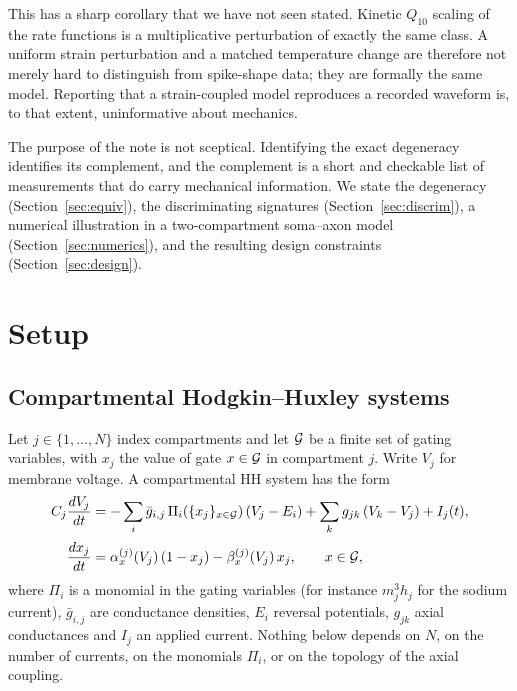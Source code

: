 This has a sharp corollary that we have not seen stated. Kinetic $Q_{10}$
scaling of the rate functions \citep{frankenhaeuser1963} is a multiplicative
perturbation of exactly the same class. A uniform strain perturbation and a
matched temperature change are therefore not merely hard to distinguish from
spike-shape data; they are formally the same model. Reporting that a
strain-coupled model reproduces a recorded waveform is, to that extent,
uninformative about mechanics.

The purpose of the note is not sceptical. Identifying the exact degeneracy
identifies its complement, and the complement is a short and checkable list of
measurements that do carry mechanical information. We state the degeneracy
(Section~\ref{sec:equiv}), the discriminating signatures
(Section~\ref{sec:discrim}), a numerical illustration in a two-compartment
soma--axon model (Section~\ref{sec:numerics}), and the resulting design
constraints (Section~\ref{sec:design}).

\section{Setup}
\label{sec:setup}

\subsection{Compartmental Hodgkin--Huxley systems}

Let $j\in\{1,\dots,N\}$ index compartments and let $\mathcal{G}$ be a finite set of
gating variables, with $x_j$ the value of gate $x\in\mathcal{G}$ in compartment
$j$. Write $V_j$ for membrane voltage. A compartmental HH system has the form
\begin{align}
C_j\frac{dV_j}{dt}
  &= -\sum_{i} \bar g_{i,j}\,\Pi_i\!\left(\{x_j\}_{x\in\mathcal{G}}\right)
     \left(V_j-E_i\right)
     +\sum_{k} g_{jk}\left(V_k-V_j\right) + I_j(t),
\label{eq:voltage}\\[2pt]
\frac{dx_j}{dt}
  &= \alpha_x^{(j)}(V_j)\left(1-x_j\right)-\beta_x^{(j)}(V_j)\,x_j,
\qquad x\in\mathcal{G},
\label{eq:gate}
\end{align}
where $\Pi_i$ is a monomial in the gating variables (for instance $m_j^3h_j$ for
the sodium current), $\bar g_{i,j}$ are conductance densities, $E_i$ reversal
potentials, $g_{jk}$ axial conductances and $I_j$ an applied current. Nothing
below depends on $N$, on the number of currents, on the monomials $\Pi_i$, or on
the topology of the axial coupling.

